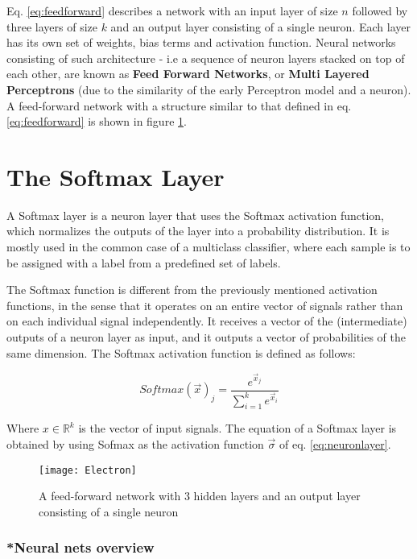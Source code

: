 Eq. \ref{eq:feedforward} describes a network with an input layer of size \(n\) followed by three layers of size \(k\) and an output layer consisting of a single neuron. Each layer has its own set of weights, bias terms and activation function. Neural networks consisting of such architecture - i.e a sequence of neuron layers stacked on top of each other, are known as \textbf{Feed Forward Networks}, or \textbf{Multi Layered Perceptrons} (due to the similarity of the early Perceptron model and a neuron).  A feed-forward network with a structure similar to that defined in eq. \ref{eq:feedforward} is shown in figure \ref{fig:feedforward}.

\section{The Softmax Layer}
A Softmax layer is a neuron layer that uses the Softmax activation function, which normalizes the outputs of the layer into a probability distribution. It is mostly used in the common case of a multiclass classifier, where each sample is to be assigned with a label from a predefined set of labels.

The Softmax function is different from the previously mentioned activation functions, in the sense that it operates on an entire vector of signals rather than on each individual signal independently. It receives a vector of the (intermediate) outputs of a neuron layer as input, and it outputs a vector of probabilities of the same dimension. The Softmax activation function is defined as follows:

\begin{equation}
    Softmax( \vec{x} )_j = \frac{e^{\vec{x}_j}}{\sum_{i=1}^k e^{\vec{x}_i}}
    \label{eq:softmax}
\end{equation}

Where $x \in \mathbb{R}^k$ is the vector of input signals. The equation of a Softmax layer is obtained by using Sofmax as the activation function \(\vec{\sigma}\) of eq.  \ref{eq:neuronlayer}.


\begin{figure}
  \centering
    \texttt{[image: Electron]}
  \caption{A feed-forward network with 3 hidden layers and an output layer consisting of a single neuron}
  \label{fig:feedforward}
\end{figure}

\subsubsection{*Neural nets overview}
